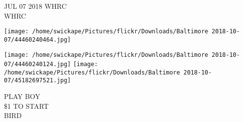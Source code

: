 \documentclass[10pt,letterpaper]{article}
\begin{document}
JUL 07 2018 WHRC\\
WHRC\\
\pagebreak

\texttt{[image: /home/swickape/Pictures/flickr/Downloads/Baltimore 2018-10-07/44460240464.jpg]}

\vspace{0.25in}
\texttt{[image: /home/swickape/Pictures/flickr/Downloads/Baltimore 2018-10-07/44460240124.jpg]}
\texttt{[image: /home/swickape/Pictures/flickr/Downloads/Baltimore 2018-10-07/45182697521.jpg]}

PLAY BOY\\
\$1 TO START\\
BIRD\\
\pagebreak
\end{document}

